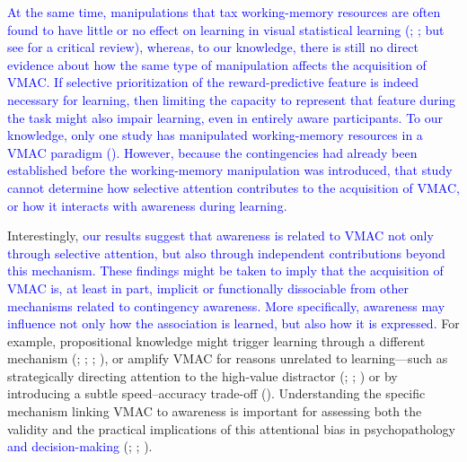 \documentclass[
  man,
  floatsintext,
  longtable,
  nolmodern,
  notxfonts,
  notimes,
  mask,
  colorlinks=true,linkcolor=blue,citecolor=blue,urlcolor=blue]{apa7}
\begin{document}
\textcolor{blue}{At the same time, manipulations that tax working-memory
resources are often found to have little or no effect on learning in
visual statistical learning (; ;
but see  for a critical review), whereas, to our knowledge, there
is still no direct evidence about how the same type of manipulation
affects the acquisition of VMAC. If selective prioritization of the
reward-predictive feature is indeed necessary for learning, then
limiting the capacity to represent that feature during the task might
also impair learning, even in entirely aware participants. To our
knowledge, only one study has manipulated working-memory resources in a
VMAC paradigm (). However, because the contingencies had already been
established before the working-memory manipulation was introduced, that
study cannot determine how selective attention contributes to the
acquisition of VMAC, or how it interacts with awareness during
learning.}

Interestingly, \textcolor{blue}{our results suggest that awareness is
related to VMAC not only through selective attention, but also through
independent contributions beyond this mechanism. These findings might be
taken to imply that the acquisition of VMAC is, at least in part,
implicit or functionally dissociable from other mechanisms related to
contingency awareness. More specifically, awareness may influence not
only how the association is learned, but also how it is expressed.} For
example, propositional knowledge might trigger learning through a
different mechanism (;
;
;
), or amplify VMAC for
reasons unrelated to learning---such as strategically directing
attention to the high-value distractor (; ;
) or by introducing a
subtle speed--accuracy trade-off
().
Understanding the specific mechanism linking VMAC to awareness is
important for assessing both the validity and the practical implications
of this attentional bias in psychopathology \textcolor{blue}{and
decision-making} (;
;
).
\end{document}
